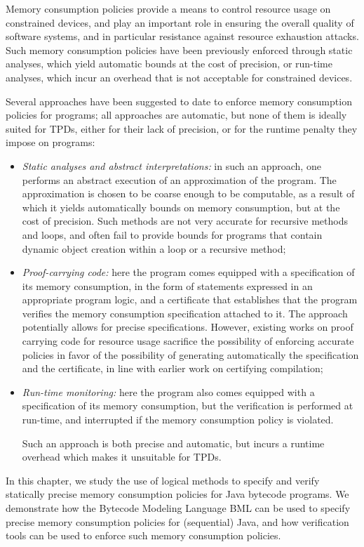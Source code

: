 
Memory consumption policies provide a means to control
resource usage on constrained devices, and play an important role
in ensuring the overall quality of software systems, and in
particular resistance against resource exhaustion attacks. Such
memory consumption policies have been previously enforced through
static analyses, which yield automatic bounds at the
cost of precision, or run-time analyses, which incur an overhead
that is not acceptable for constrained devices.

Several approaches have been suggested to date to enforce memory
consumption policies for programs; all approaches are automatic,
but none of them is ideally suited for TPDs, either for their
lack of precision, or for the runtime penalty they impose on
programs:
\begin{itemize}
\item \emph{Static analyses and abstract interpretations:} in such an
approach, one performs an abstract execution of an approximation of
the program. The approximation is chosen to be coarse enough to be
computable, as a result of which it yields automatically bounds on
memory consumption, but at the cost of precision. Such methods are not
very accurate for recursive methods and loops, and often fail to
provide bounds for programs that contain dynamic object creation
within a loop or a recursive method;


\item \emph{Proof-carrying code:} here the program
comes equipped with a specification of its memory consumption, in the
form of statements expressed in an appropriate program logic, and a
certificate that establishes that the program verifies the memory
consumption specification attached to it. The approach potentially
allows for precise specifications. However, existing works on proof
carrying code for resource usage sacrifice the possibility of
enforcing accurate policies in favor of the possibility of generating
automatically the specification and the certificate, in line with
earlier work on certifying compilation;

\item \emph{Run-time monitoring:} here the program also comes equipped
with a specification of its memory consumption, but the verification
is performed at run-time, and interrupted if the memory consumption
policy is violated.
 


Such an approach is both precise and automatic, but incurs a runtime
overhead which makes it unsuitable for TPDs.
\end{itemize}
In this chapter, we study the use of logical methods to specify and
verify statically precise memory consumption policies for Java
bytecode programs. We demonstrate how the Bytecode Modeling
Language BML  can be used to specify precise memory consumption policies
for (sequential) Java, and how verification tools can
be used to enforce such memory consumption policies. 


